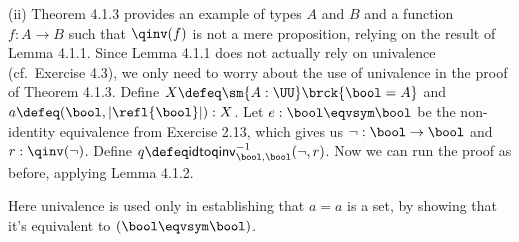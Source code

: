 (ii) Theorem 4.1.3 provides an example of types $A$ and $B$ and a function $f:
A \to B$ such that $\qinv(f)$ is not a mere proposition, relying on the result
of Lemma 4.1.1.  Since Lemma 4.1.1 does not actually rely on univalence
(cf.~Exercise 4.3), we only need to worry about the use of univalence in the
proof of Theorem 4.1.3.  Define $X \defeq \sm{A : \UU} \brck{\bool = A}$ and
$a \defeq (\bool, \lvert \refl{\bool} \rvert) : X$.  Let $e : \bool \eqvsym
\bool$ be the non-identity equivalence from Exercise 2.13, which gives us
$\lnot : \bool \to \bool$ and $r : \qinv(\lnot)$.  Define $q \defeq
\mathsf{idtoqinv}_{\bool, \bool}^{-1}(\lnot, r)$.  Now we can run the proof as
before, applying Lemma 4.1.2.  


Here univalence is used only in establishing that $a = a$ is a set, by showing
that it's equivalent to $(\bool \eqvsym \bool)$.
